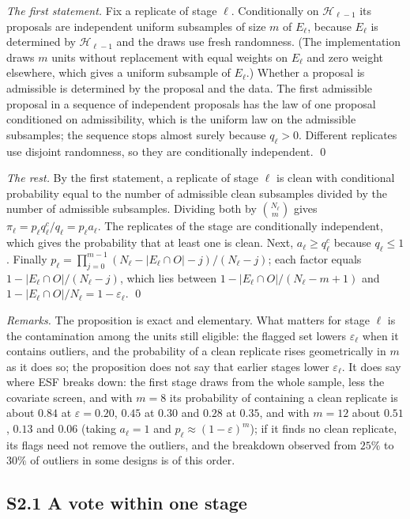 \emph{The first statement.} Fix a replicate of stage $\ell$. Conditionally on
$\mathcal H_{\ell-1}$ its proposals are independent uniform subsamples of size $m$ of $E_\ell$,
because $E_\ell$ is determined by $\mathcal H_{\ell-1}$ and the draws use fresh randomness. (The
implementation draws $m$ units without replacement with equal weights on $E_\ell$ and zero
weight elsewhere, which gives a uniform subsample of $E_\ell$.) Whether a proposal is admissible
is determined by the proposal and the data. The first admissible proposal in a sequence of
independent proposals has the law of one proposal conditioned on admissibility, which is the
uniform law on the admissible subsamples; the sequence stops almost surely because $q_\ell>0$.
Different replicates use disjoint randomness, so they are conditionally independent. \qed

\emph{The rest.} By the first statement, a replicate of stage $\ell$ is clean with
conditional probability equal to the number of admissible clean subsamples divided by the
number of admissible subsamples. Dividing both by $\binom{N_\ell}{m}$ gives
$\pi_\ell=p_\ell q^{c}_\ell/q_\ell=p_\ell a_\ell$. The replicates of the stage are
conditionally independent, which gives the probability that at least one is clean. Next,
$a_\ell\ge q^{c}_\ell$ because $q_\ell\le1$. Finally
$p_\ell=\prod_{j=0}^{m-1}(N_\ell-|E_\ell\cap O|-j)/(N_\ell-j)$; each factor equals
$1-|E_\ell\cap O|/(N_\ell-j)$, which lies between $1-|E_\ell\cap O|/(N_\ell-m+1)$ and
$1-|E_\ell\cap O|/N_\ell=1-\varepsilon_\ell$. \qed

\emph{Remarks.} The proposition is exact and elementary. What matters for stage $\ell$ is the contamination
among the units still eligible: the flagged set lowers $\varepsilon_\ell$ when it contains
outliers, and the probability of a clean replicate rises geometrically in $m$ as it does so;
the proposition does not say that earlier stages lower $\varepsilon_\ell$. It does say where
ESF breaks down: the first stage draws from the whole sample, less the covariate screen, and
with $m=8$ its probability of containing a clean replicate is about $0.84$ at
$\varepsilon=0.20$, $0.45$ at $0.30$ and $0.28$ at $0.35$, and with $m=12$ about $0.51$,
$0.13$ and $0.06$ (taking $a_\ell=1$ and $p_\ell\approx(1-\varepsilon)^{m}$); if it finds no
clean replicate, its flags need not remove the outliers, and the breakdown observed from
$25\%$ to $30\%$ of outliers in some designs is of this order.

\subsection*{S2.1 A vote within one stage}

